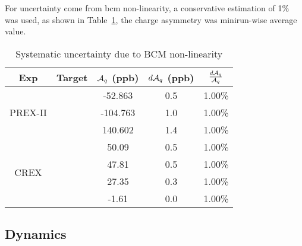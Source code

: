 For uncertainty come from bcm non-linearity, a conservative estimation of 1\% was used,
as shown in Table~\ref{tab:AT_bcm_non-linearity}, the charge asymmetry was minirun-wise average 
value.
\begin{table}[!h]
    \centering
    \begin{tabular}{c c | c c c}
	\hline
	Exp & Target	& $\mathcal{A}_{q}$ (ppb) & $d\mathcal{A}_{q}$ (ppb)    & $\frac{d\mathcal{A}_{q}}{\mathcal{A}_{q}}$   \\
	\hline
	\multirow{3}{*}{PREX-II}
	    & \C    & -52.863   & 0.5   & 1.00\%    \\ 
	    & \ca   & -104.763  & 1.0   & 1.00\%    \\ 
	    & \Pb   & 140.602   & 1.4   & 1.00\%    \\ 
	\hline
	\multirow{4}{*}{CREX}
	    & \C    & 50.09	& 0.5   & 1.00\%    \\ 
	    & \ca   & 47.81	& 0.5   & 1.00\%    \\ 
	    & \Ca   & 27.35	& 0.3   & 1.00\%    \\ 
	    & \Pb   & -1.61	& 0.0   & 1.00\%    \\ 
	\hline
    \end{tabular}
    \caption{Systematic uncertainty due to BCM non-linearity}
    \label{tab:AT_bcm_non-linearity}
\end{table}

\subsection{Dynamics}

